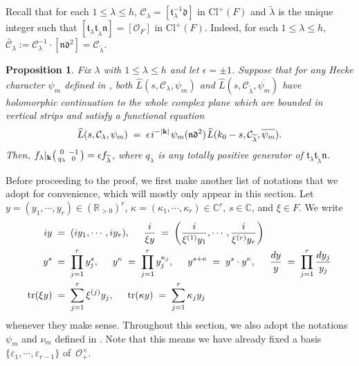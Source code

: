 \documentclass[11pt]{amsart}
\newtheorem{prop}[theorem]{Proposition}
\theoremstyle{remark}
\newcommand\sm[1]{\begin{psmallmatrix}#1\end{psmallmatrix}}
\newcommand\mbf[1]{\mathbf{#1}}
\newcommand\cl[1]{\mathcal{#1}}
\newcommand\fr[1]{\mathfrak{#1}}
\newcommand\ov[1]{\overline{#1}}
\newcommand\wt[1]{\widetilde{#1}}
\newcommand\wh[1]{\widehat{#1}}
\newcommand{\real}{\mathbb{R}}
\newcommand{\comp}{\mathbb{C}}
\newcommand{\eps}{\varepsilon}
\newcommand{\clo}{\mathcal{O}}
\newcommand{\eq}{\;=\;}
\def\thin{{\hskip 1pt}}
\newcommand{\tr}{\mathrm{tr}}
\newcommand{\Cl}{\mathrm{Cl}}
\begin{document}
Recall that for each $1\leq\lambda\leq h$, $\cl{C}_\lambda=[\fr{t}_\lambda^{-1}\fr{d}]$ in $\Cl^+(F)$ and $\wt{\lambda}$ is the unique integer such that $[\fr{t}_\lambda\fr{t}_{\wt{\lambda}}\fr{n}]=[\clo_F]$ in $\Cl^+(F)$. Indeed, for each $1\leq\lambda\leq h$, $\wt{\cl{C}_\lambda}:=\cl{C}_\lambda^{-1}\cdot[\fr{n}\fr{d}^2]=\cl{C}_{\wt{\lambda}}$.

\begin{prop}
\label{fqnprop}
Fix $\lambda$ with $1\leq\lambda\leq h$ and let $\epsilon=\pm1$. Suppose that for any Hecke character $\psi_m$ defined in , both $\wh{L}(s,\cl{C}_\lambda,\psi_m)$ and $\wh{L}(s,\cl{C}_{\wt{\lambda}},\ov{\psi_m})$ have holomorphic continuation to the whole complex plane which are bounded in vertical strips and satisfy a functional equation
\begin{align}
\label{fqnequivclass}
    \wh{L}(s,\cl{C}_\lambda,\psi_m)\eq \epsilon \thin i^{-|\mbf{k}|}\thin\psi_m(\fr{n}\fr{d}^2)\thin\wh{L}(k_0-s,\cl{C}_{\wt{\lambda}},\ov{\psi_m}).
\end{align}
Then, $f_\lambda|_\mbf{k}\sm{0&-1\\q_\lambda&0}=\epsilon f_{\wt{\lambda}}$, where $q_\lambda$ is any totally positive generator of $\fr{t}_\lambda\fr{t}_{\wt{\lambda}}\fr{n}$.
\end{prop}

Before proceeding to the proof, we first make another list of notations that we adopt for convenience, which will mostly only appear in this section. Let $y=(y_1,\cdots,y_r)\in(\real_{>0})^r$, $\kappa=(\kappa_1,\cdots,\kappa_r)\in\comp^r$, $s\in\comp$, and $\xi\in F$. We write
\begin{align*}
    iy&\eq(iy_1,\cdots,iy_r),\hspace{0.5cm}\frac{i}{\xi y}\eq\bigg(\frac{i}{\xi^{(1)}y_1},\cdots,\frac{i}{\xi^{(r)}y_r}\bigg) \\
    y^s&\eq\prod_{j=1}^ry_j^s,\hspace{0.5cm} y^\kappa\eq\prod_{j=1}^ry_j^{\kappa_j},\hspace{0.5cm} y^{s+\kappa}\eq y^s\cdot y^\kappa, \hspace{0.5cm}
    \frac{dy}{y}\eq\prod_{j=1}^r\frac{dy_j}{y_j} \\
    \tr(\xi y)&\eq\sum_{j=1}^r \xi^{(j)}y_j, \hspace{0.5cm}\tr(\kappa y)\eq\sum_{j=1}^r\kappa_j y_j
\end{align*}
whenever they make sense. Throughout this section, we also adopt the notations $\psi_m$ and $\nu_m$ defined in . Note that this means we have already fixed a basis $\{\eps_1,\cdots,\eps_{r-1}\}$ of~$\clo_+^\times$. 
\\
\end{document}

